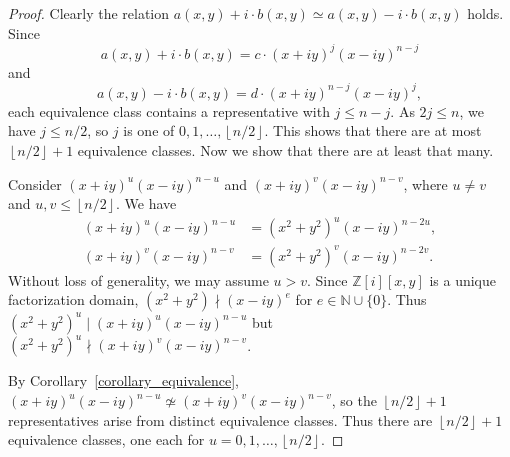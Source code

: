 \documentclass[12pt,table]{article}
\numberwithin{equation}{section}
\newcommand{\myfrac}[2]{#1 / #2}
\newcommand{\Nnn}{\mathbb N}
\newcommand{\Zzz}{\mathbb Z}
\newcommand{\divides}{\mid}
\newcommand{\notdivides}{\nmid}
\begin{document}
\begin{landscape}
{{\begin{proof}
Clearly the relation
$ a(x,y) + i \cdot b(x,y) \simeq  a(x,y) - i \cdot b(x,y) $
holds.
Since 
\[ 
a(x,y) + i \cdot b(x,y) = c \cdot (x + iy)^j (x -  iy)^{n-j} 
\]
and 
\[ 
a(x,y) - i \cdot b(x,y) = d \cdot (x + iy)^{n-j} (x -  iy)^j,
\]
each equivalence class contains a representative with $ j \leq n - j
$.  As $ 2j \leq n $, we have $ j \leq \myfrac{n}{2} $, so $ j $
is one of $ 0, 1, \dotsc, \left\lfloor \myfrac{n}{2} \right\rfloor $. This shows
that there are at most $ \left\lfloor \myfrac{n}{2} \right\rfloor + 1 $
equivalence classes. Now we show that there are at least that many.



Consider $ (x + iy)^u (x -  iy)^{n-u} $  and $ (x + iy)^v (x -  iy)^{n-v} $,
where $ u \neq v $ and $u,v \leq \left \lfloor \myfrac{n}{2} \right \rfloor $. We have
\begin{align*}
(x + iy)^u (x -  iy)^{n-u} &= (x^2 + y^2)^u (x -  iy)^{n-2u},
\\
(x + iy)^v (x -  iy)^{n-v} &= (x^2 + y^2)^v (x -  iy)^{n-2v}.
\end{align*}
Without loss of generality, we may assume $ u > v $. 
Since $ \Zzz [i][x,y] $ is a unique factorization domain,
$ (x^2 + y^2) \notdivides (x -  iy)^e $ for $ e \in \Nnn \cup \{ 0 \} $.
Thus $ (x^2 + y^2)^u \divides (x + iy)^u (x -  iy)^{n-u} $
but $ (x^2 + y^2)^u \notdivides (x + iy)^v (x -  iy)^{n-v} $.

By Corollary~\ref{corollary_equivalence},
$ (x + iy)^u (x -  iy)^{n-u} \not\simeq (x + iy)^v (x -  iy)^{n-v} $, 
so the $ \left\lfloor \myfrac{n}{2} \right\rfloor + 1 $ representatives arise from
distinct equivalence classes.
Thus there are $ \left\lfloor \myfrac{n}{2} \right\rfloor + 1 $ equivalence classes, 
one each for $ u = 0, 1, \dotsc,  \left\lfloor \myfrac{n}{2} \right\rfloor $.
\end{proof}







\begin{figure}[h]


\begin{center}
\end{center}
\end{figure}}}
\end{landscape}
\end{document}
